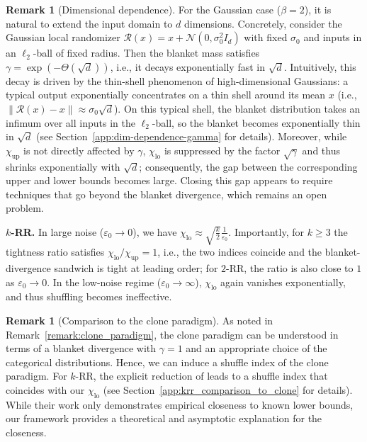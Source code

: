 \documentclass{article}
\theoremstyle{plain}
\theoremstyle{definition}
\newtheorem{remark}[theorem]{Remark}
\begin{document}
\begin{remark}[Dimensional dependence]
\label{remark:dimensional_dependence}
For the Gaussian case ($\beta=2$), it is natural to extend the input domain to $d$ dimensions.
Concretely, consider the Gaussian local randomizer $\mathcal R(x)=x+\mathcal N(0,\sigma_0^2 I_d)$ with fixed $\sigma_0$ and inputs in an $\ell_2$-ball of fixed radius.
Then the blanket mass satisfies $\gamma=\exp(-\Theta(\sqrt d))$, i.e., it decays exponentially fast in $\sqrt d$.
Intuitively, this decay is driven by the thin-shell phenomenon of high-dimensional Gaussians: a typical output exponentially concentrates on a thin shell around its mean $x$ (i.e., $\|\mathcal R(x)-x\|\approx \sigma_0\sqrt d$).
On this typical shell, the blanket distribution takes an infimum over all inputs in the $\ell_2$-ball, so the blanket becomes exponentially thin in $\sqrt d$ (see Section~\ref{app:dim-dependence-gamma} for details).
Moreover, while $\chi_{\mathrm{up}}$ is not directly affected by $\gamma$, $\chi_{\mathrm{lo}}$ is suppressed by the factor $\sqrt{\gamma}$ and thus shrinks exponentially with $\sqrt{d}$; consequently, the gap between the corresponding upper and lower bounds becomes large.
Closing this gap appears to require techniques that go beyond the blanket divergence, which remains an open problem.
\end{remark}


\textbf{$k$-RR.}
In large noise ($\varepsilon_0\to 0$), we have $\chi_{\mathrm{lo}}\approx\sqrt{\frac{k}{2}}\frac{1}{\varepsilon_0}$.
Importantly, for $k\ge 3$ the tightness ratio satisfies $\chi_{\mathrm{lo}}/\chi_{\mathrm{up}}=1$, i.e., the two indices coincide and the blanket-divergence sandwich is tight at leading order; for $2$-RR, the ratio is also close to $1$ as $\varepsilon_0\to 0$.
In the low-noise regime ($\varepsilon_0\to\infty$), $\chi_{\mathrm{lo}}$ again vanishes exponentially, and thus shuffling becomes ineffective.

\begin{remark}[Comparison to the clone paradigm]
\label{remark:comparison_to_clone}
As noted in Remark~\ref{remark:clone_paradigm}, the clone paradigm can be understood in terms of a blanket divergence with $\gamma=1$ and an appropriate choice of the categorical distributions. 
Hence, we can induce a shuffle index of the clone paradigm.
For $k$-RR, the explicit reduction of \citet[Theorem~7.4]{feldmanStrongerPrivacyAmplification2023a} leads to a shuffle index that coincides with our $\chi_{\mathrm{lo}}$ (see Section~\ref{app:krr_comparison_to_clone} for details).
While their work only demonstrates empirical closeness to known lower bounds, our framework provides a theoretical and asymptotic explanation for the closeness.
\end{remark}
\end{document}
